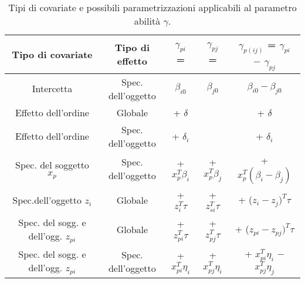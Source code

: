 	\begin{table}[!htb]%
	
	\renewcommand{\arraystretch}{1.7}
	\centering
	\begin{tabular}{c c c c c}
		\hline	
		
		\textbf{Tipo di covariate} & \textbf{Tipo di effetto} & \textbf{$\gamma_{pi}$ =}& \textbf{$\gamma_{pj}$ =} & \textbf{$\gamma_{p(ij)}$ = $\gamma_{pi}$ $-$ $\gamma_{pj}$} \\	
		\hline			
		Intercetta & Spec. dell'oggetto & $\beta_{i0}$ & $\beta_{j0}$ & $\beta_{i0} - \beta_{j0}$\\
		Effetto dell'ordine & Globale & + $\delta$ &  & + $\delta$ \\
		Effetto dell'ordine & Spec. dell'oggetto &  + $\delta_i$ &  &  + $\delta_i$\\
		Spec. del soggetto $x_p$ & Spec. dell'oggetto & + $x^T_p\beta_i$ & + $x^T_p\beta_j$ & + $x^T_p(\beta_i - \beta_j)$\\
		Spec.dell'oggetto  $z_i$ & Globale & + $z^T_{i}\tau$ & + $z^T_{si}\tau$ & + ($z_{i} - z_{j})^T\tau$\\
		Spec. del sogg. e dell'ogg. $z_{pi}$ & Globale & + $z^T_{pi}\tau$ & + $z^T_{pj}\tau$ & + ($z_{pi} - z_{pj})^T\tau$\\
		Spec. del sogg. e dell'ogg. $z_{pi}$ & Spec. dell'oggetto & + $x^T_{pi}\eta_i$ & + $x^T_{pj}\eta_i$& + $x^T_{pi}\eta_i$ $-$ $x^T_{pj}\eta_j$\\
		\hline
		
		
	\end{tabular} \hbox{}
	
	\caption{Tipi di covariate e possibili parametrizzazioni applicabili al parametro abilità $\gamma$.} \label{tab:type}
\end{table}

